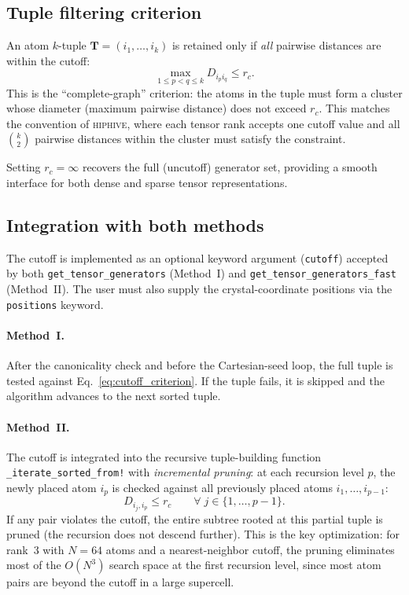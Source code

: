 \documentclass[twocolumn,amsmath,amssymb,aps,prb,10pt,floatfix]{revtex4-2}
\newcommand{\vT}{\mathbf{T}}
\begin{document}
\subsection{Tuple filtering criterion}

An atom $k$-tuple $\vT = (i_1, \ldots, i_k)$ is retained only if \emph{all} pairwise distances are within the cutoff:
\begin{equation}
\max_{1 \leq p < q \leq k} D_{i_p i_q} \leq r_c.
\label{eq:cutoff_criterion}
\end{equation}
This is the ``complete-graph'' criterion: the atoms in the tuple must form a cluster whose diameter (maximum pairwise distance) does not exceed $r_c$.
This matches the convention of \textsc{hiphive}, where each tensor rank accepts one cutoff value and all $\binom{k}{2}$ pairwise distances within the cluster must satisfy the constraint.

Setting $r_c = \infty$ recovers the full (uncutoff) generator set, providing a smooth interface for both dense and sparse tensor representations.

\subsection{Integration with both methods}

The cutoff is implemented as an optional keyword argument (\texttt{cutoff}) accepted by both \texttt{get\_tensor\_generators} (Method~I) and \texttt{get\_tensor\_generators\_fast} (Method~II).
The user must also supply the crystal-coordinate positions via the \texttt{positions} keyword.

\paragraph{Method~I.}
After the canonicality check and before the Cartesian-seed loop, the full tuple is tested against Eq.~\eqref{eq:cutoff_criterion}.
If the tuple fails, it is skipped and the algorithm advances to the next sorted tuple.

\paragraph{Method~II.}
The cutoff is integrated into the recursive tuple-building function \texttt{\_iterate\_sorted\_from!} with \emph{incremental pruning}: at each recursion level $p$, the newly placed atom $i_p$ is checked against all previously placed atoms $i_1, \ldots, i_{p-1}$:
\begin{equation}
D_{i_j, i_p} \leq r_c \qquad \forall\; j \in \{1, \ldots, p-1\}.
\label{eq:incremental_cutoff}
\end{equation}
If any pair violates the cutoff, the entire subtree rooted at this partial tuple is pruned (the recursion does not descend further).
This is the key optimization: for rank~3 with $N = 64$ atoms and a nearest-neighbor cutoff, the pruning eliminates most of the $O(N^3)$ search space at the first recursion level, since most atom pairs are beyond the cutoff in a large supercell.
\end{document}
